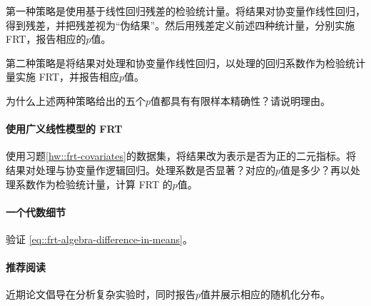 第一种策略是使用基于线性回归残差的检验统计量。将结果对协变量作线性回归，得到残差，并把残差视为“伪结果”。然后用残差定义前述四种统计量，分别实施 FRT，报告相应的$p$值。


第二种策略是将结果对处理和协变量作线性回归，以处理的回归系数作为检验统计量实施 FRT，并报告相应$p$值。 


为什么上述两种策略给出的五个$p$值都具有有限样本精确性？请说明理由。 



\paragraph{使用广义线性模型的 FRT}
\label{hw::frt-glm}


使用习题\ref{hw::frt-covariates}的数据集，将结果改为表示是否为正的二元指标。将结果对处理与协变量作逻辑回归。处理系数是否显著？对应的$p$值是多少？再以处理系数作为检验统计量，计算 FRT 的$p$值。 




\paragraph{一个代数细节}
\label{hw::frt-algebraic-detail}

验证 \eqref{eq::frt-algebra-difference-in-means}。 



\paragraph{推荐阅读}

近期论文\citet{bind2020possible}倡导在分析复杂实验时，同时报告$p$值并展示相应的随机化分布。 


